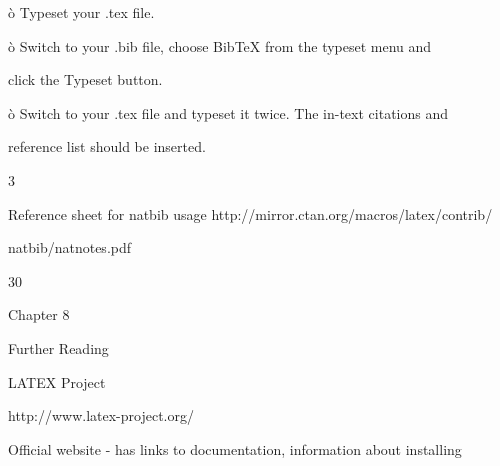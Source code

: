 \documentclass[a4paper,portrait,12pt]{article}
\begin{document}
\begin{flushleft}
\`{o} Typeset your .tex file.
\end{flushleft}


\begin{flushleft}
\`{o} Switch to your .bib file, choose BibTeX from the typeset menu and
\end{flushleft}


\begin{flushleft}
click the Typeset button.
\end{flushleft}


\begin{flushleft}
\`{o} Switch to your .tex file and typeset it twice. The in-text citations and
\end{flushleft}


\begin{flushleft}
reference list should be inserted.
\end{flushleft}





3





\begin{flushleft}
Reference sheet for natbib usage http://mirror.ctan.org/macros/latex/contrib/
\end{flushleft}


\begin{flushleft}
natbib/natnotes.pdf
\end{flushleft}





30





\begin{flushleft}
\newpage
Chapter 8
\end{flushleft}


\begin{flushleft}
Further Reading
\end{flushleft}


\begin{flushleft}
LATEX Project
\end{flushleft}


\begin{flushleft}
http://www.latex-project.org/
\end{flushleft}


\begin{flushleft}
Official website - has links to documentation, information about installing
\end{flushleft}
\end{document}
